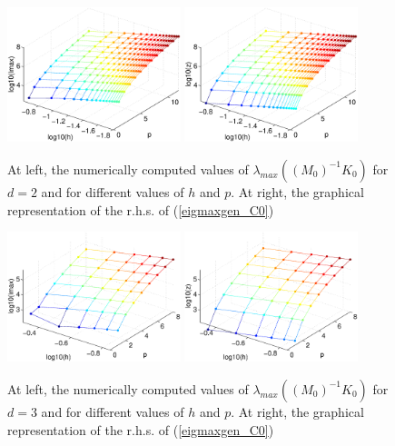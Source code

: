 \documentclass[11pt]{article}
\begin{document}
\begin{figure}
\begin{center}
\includegraphics[width=0.45\textwidth]{Images/iga0_eiggen2max.eps}\quad
\includegraphics[width=0.45\textwidth]{Images/iga0_eiggen2smax.eps}
\end{center}
\caption{At left, the numerically computed values of
$\lambda_{max}((M_0)^{-1}K_0)$ for $d=2$ and
for different values of $h$ and $p$. At right,
the graphical representation of the r.h.s. of (\ref{eigmaxgen_C0})}
\label{fig:genmax-iga0d2}
\end{figure}

\begin{figure}
\begin{center}
\includegraphics[width=0.45\textwidth]{Images/iga0_eiggen3max.eps}\quad
\includegraphics[width=0.45\textwidth]{Images/iga0_eiggen3smax.eps}
\end{center}
\caption{At left, the numerically computed values of
$\lambda_{max}((M_0)^{-1}K_0)$ for $d=3$ and
for different values of $h$ and $p$. At right,
the graphical representation of the r.h.s. of (\ref{eigmaxgen_C0})}
\label{fig:genmax-iga0d3}
\end{figure}
\end{document}
